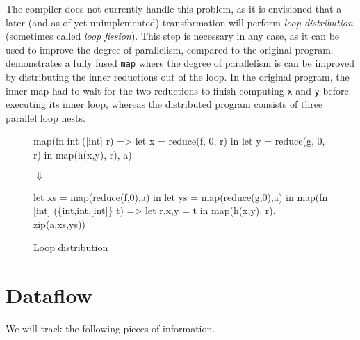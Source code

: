 \begin{description}[style=nextline]
  The \LO{} compiler does not currently handle this problem, as it is
  envisioned that a later (and as-of-yet unimplemented) transformation
  will perform \textit{loop distribution} (sometimes called
  \textit{loop fission}).  This step is necessary in any case, as it
  can be used to improve the degree of parallelism, compared to the
  original program.   demonstrates a fully
  fused \texttt{map} where the degree of parallelism is can be
  improved by distributing the inner reductions out of the loop.  In
  the original program, the inner map had to wait for the two
  reductions to finish computing \texttt{x} and \texttt{y} before
  executing its inner loop, whereas the distributed program consists
  of three parallel loop nests.
\end{description}

\begin{figure}
\begin{center}
\begin{bcolorcode}
map(fn int ([int] r) =>
      let x = reduce(f, 0, r) in
      let y = reduce(g, 0, r) in
      map(h(x,y), r),
    a)
\end{bcolorcode}

$\Downarrow$

\begin{bcolorcode}
let xs = map(reduce(f,0),a) in
let ys = map(reduce(g,0),a) in
map(fn [int] (\{int,int,[int]\} t) =>
      let {r,x,y} = t in
      map(h(x,y), r),
    zip(a,xs,ys))
\end{bcolorcode}
\end{center}
\caption{Loop distribution}
\label{fig:loop-distribution}
\end{figure}

\section{Dataflow}

\newcommand{\unfusable}[0]{\textsc{unfusable}}
\newcommand{\inputs}[0]{\textsc{arrInputs}}
\newcommand{\soacs}[0]{\textsc{SOACs}}
\newcommand{\patNames}[1]{\textsc{patNames}(#1)}
\newcommand{\childExps}[1]{\textsc{childExps}(#1)}
\newcommand{\parentExp}[1]{\textsc{parentExp}(#1)}

We will track the following pieces of information.

